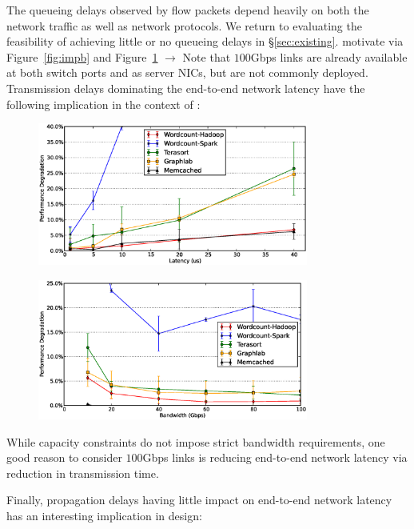 \vspace{0.1in}
\noindent
The queueing delays observed by flow packets depend heavily on both the network traffic as well as network protocols. We return to evaluating the feasibility of achieving little or no queueing delays in \S\ref{sec:existing}. {motivate via Figure~\ref{fig:impb} and Figure~\ref{fig:impl} $\to$} Note that $100$Gbps links are already available at both switch ports and as server NICs, but are not commonly deployed. Transmission delays dominating the end-to-end network latency have the following implication in the context of \dis:

%
\begin{figure}
  \centering
    \includegraphics[width = 3.5in]{img/fix_bw_vary_latency.eps} 
  \caption{\small{}}
  \label{fig:impl}
\end{figure}
%
%
\begin{figure}
  \centering
    \includegraphics[width = 3.5in]{img/fix_latency_vary_bw.eps} 
  \caption{\small{}}
  \label{fig:impbw}
\end{figure}
%
 While capacity constraints do not impose strict bandwidth requirements, one good reason to consider $100$Gbps links is reducing end-to-end network latency via reduction in transmission time. 

\vspace{0.1in}
\noindent
 Finally, propagation delays having little impact on end-to-end network latency has an interesting implication in \dis design:

